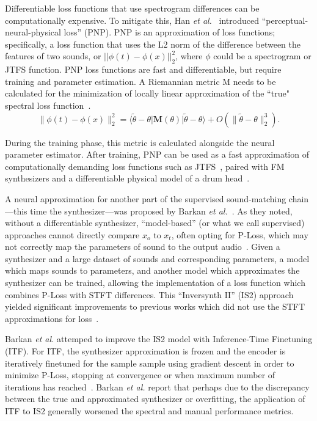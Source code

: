 \documentclass[lettersize,journal]{IEEEtran}
\begin{document}
Differentiable loss functions that use spectrogram differences can be computationally expensive. To mitigate this, Han \textit{et al.}~\cite{han2023perceptual} introduced ``perceptual-neural-physical loss'' (PNP). PNP is an approximation of loss functions; specifically, a loss function that uses the L2 norm of the difference between the features of two sounds, or $||\phi(t) - \phi(x)||^2_2$, where $\phi$ could be a spectrogram or JTFS function. PNP loss functions are fast and differentiable, but require training and parameter estimation. A Riemannian metric M needs to be calculated for the minimization of locally linear approximation of the ``true" spectral loss function~\cite{han2023perceptual}. 
\[
\|\phi(t) - \phi(x)\|_2^2 = \langle \tilde{\theta} - \theta | \mathbf{M}(\theta) | \tilde{\theta} - \theta \rangle + O(\|\tilde{\theta} - \theta\|_2^3). \tag{4}
\]

During the training phase, this metric is calculated alongside the neural parameter estimator. After training, PNP can be used as a fast approximation of computationally demanding loss functions such as JTFS~\cite{han2023perceptual,han2024learning}, paired with FM synthesizers and a differentiable physical model of a drum head~\cite{smith2010physical}.

A neural approximation for another part of the supervised sound-matching chain---this time the synthesizer---was proposed by Barkan \textit{et al.}~\cite{barkan2023inversynthII}. As they noted, without a differentiable synthesizer, ``model-based'' (or what we call supervised) approaches cannot directly compare $x_o$ to $x_t$, often opting for P-Loss, which may not correctly map the parameters of sound to the output audio~\cite{esling2019flow,han2023perceptual,masuda2023improving}. Given a synthesizer and a large dataset of sounds and corresponding parameters, a model which maps sounds to parameters, and another model which approximates the synthesizer can be trained, allowing the implementation of a loss function which combines P-Loss with STFT differences. This ``Inversynth II'' (IS2) approach yielded significant improvements to previous works which did not use the STFT approximations for loss~\cite{esling2019flow,barkan2019inversynth}.

Barkan \textit{et al.} attemped to  improve the IS2 model with Inference-Time
Finetuning (ITF). For ITF, the synthesizer approximation is frozen and the encoder is iteratively finetuned for the sample sample using gradient descent in order to minimize P-Loss, stopping at convergence or when maximum number of iterations has reached~\cite{barkan2023inversynthII}. Barkan \textit{et al.} report that perhaps due to the discrepancy between the true and approximated synthesizer or overfitting, the application of ITF to IS2 generally worsened the spectral and manual performance metrics.
\end{document}

